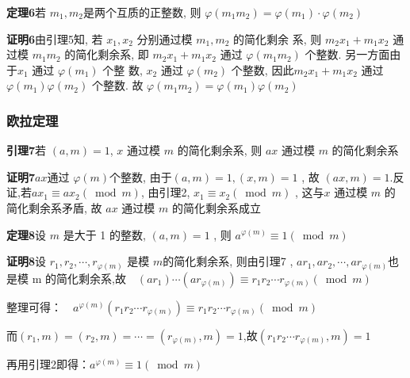 \documentclass[12pt,hyperref,a4paper,UTF8]{ctexart}
\begin{document}
\textbf{定理6}\quad 若 $ m_{1}, m_{2}  $是两个互质的正整数, 则 $ \varphi\left(m_{1} m_{2}\right)=   \varphi\left(m_{1}\right) \cdot \varphi\left(m_{2}\right)$\par
\vskip 2pt
\textbf{证明6}\quad 由引理5知, 若  $x_{1}, x_{2} $ 分别通过模  $m_{1}, m_{2} $ 的简化剩余 系, 则 $ m_{2} x_{1}+m_{1} x_{2} $ 通过模 $ m_{1} m_{2}$  的简化剩余系, 即 $ m_{2} x_{1}+   m_{1} x_{2}$  通过 $ \varphi\left(m_{1} m_{2}\right)$  个整数. 另一方面由于$  x_{1} $ 通过 $ \varphi\left(m_{1}\right) $ 个整 数, $ x_{2} $ 通过 $ \varphi\left(m_{2}\right) $ 个整数, 因此$  m_{2} x_{1}+m_{1} x_{2} $ 通过 $ \varphi\left(m_{1}\right) \varphi\left(m_{2}\right) $ 个整数. 故 $ \varphi\left(m_{1} m_{2}\right)=\varphi\left(m_{1}\right) \varphi\left(m_{2}\right)$ \par 
\quad  \par 

\subsubsection{欧拉定理}

\textbf{引理7}\quad 若 $(a, m)=1$, $x$  通过模 $ m $ 的简化剩余系, 则 $ a x $ 通过模 $ m $ 的简化剩余系\par 
\vskip 2pt
\textbf{证明7}\quad $a x  $通过  $\varphi(m)  $个整数, 由于$  (a, m)=1,(x, m)=1$ , 故 $ (a x, m)=1 $.反证,若$  a x_{1} \equiv a x_{2}(\bmod m) $, 由引理2, $ x_{1} \equiv   x_{2}(\bmod m)$ , 这与$x$  通过模 $ m $ 的简化剩余系矛盾, 故 $ a x $ 通过模 $ m $ 的简化剩余系成立\par  
\vskip 12pt

\textbf{定理8}\quad 设 $ m $ 是大于 1 的整数, $ (a, m)=1$ , 则 $ a^{\varphi(m)} \equiv 1(\bmod m)$\par 
\vskip 2pt
\textbf{证明8}\quad 设 $ r_{1}, r_{2}, \cdots, r_{\varphi(m)} $ 是模 $ m  $的简化剩余系, 则由引理7 , $ a r_{1}, a r_{2}, \cdots, a r_{\varphi(m)}  $也是模  m  的简化剩余系,故$\quad\left(a r_{1}\right) \cdots\left(a r_{\varphi(m)}\right) \equiv r_{1}r_{2} \cdots r_{\varphi(m)}(\bmod m)$\par 
整理可得：$\quad a^{\varphi(m)}\left(r_{1} r_{2} \cdots r_{\varphi(m)}\right) \equiv r_{1} r_{2} \cdots r_{\varphi(m)}(\bmod m)$\par 
而$\left(r_{1}, m\right)=\left(r_{2}, m\right)=\cdots=\left(r_{\varphi(m)}, m\right)=1$,故$\left(r_{1} r_{2} \cdots r_{\varphi(m)}, m\right) =1$\par 
再用引理2即得：$ a^{\varphi(m)} \equiv 1(\bmod m)$\par
\quad  \par 
\end{document}
